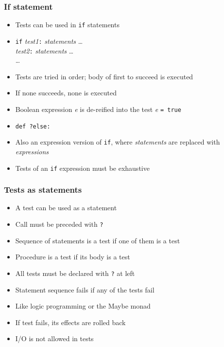 \documentclass[12pt]{beamer}
\begin{document}
\begin{frame}
\frametitle{If statement}
\begin{itemize}
\item Tests can be used in \texttt{if} statements
\item \texttt{if} \emph{test1}\texttt{:} \emph{statements} \ldots \\
\hspace*{1em} \emph{test2}\texttt{:} \emph{statements} \ldots \\
\hspace*{1em} \ldots \\
\item Tests are tried in order; body of first to succeed is executed
\item If none succeeds, none is executed
\item Boolean expression \emph{e} is de-reified into the test \emph{e}
  \texttt{= true}
\item \texttt{def ?else:}
\item Also an expression version of \texttt{if}, where
  \emph{statements} are replaced with \emph{expressions}
\item Tests of an \texttt{if} expression must be exhaustive
\end{itemize}
\end{frame}


\begin{frame}
\frametitle{Tests as statements}
\begin{itemize}
\item A test can be used as a statement
\item Call must be preceded with \texttt{?}
\item Sequence of statements is a test if one of them is a test
\item Procedure is a test if its body is a test
\item All tests must be declared with \texttt{?} at left
\item Statement sequence fails if any of the tests fail
\item Like logic programming or the Maybe monad
\item If test fails, its effects are rolled back
\item I/O is not allowed in tests
\end{itemize}
\end{frame}
\end{document}
